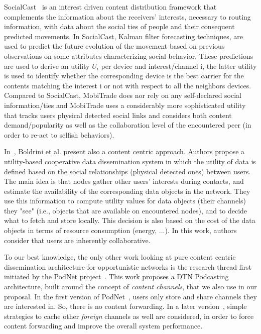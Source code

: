SocialCast~\cite{SocialCast2, SocialCast} is an interest driven content distribution framework that complements the information about the receivers' interests, necessary to routing information, with data about the social ties of people and their consequent predicted movements. In SocialCast, Kalman filter forecasting techniques, are used to predict the future evolution of the movement based on previous observations on some attributes characterizing social behavior. These predictions are used to derive an utility $U_i$ per device and interest/channel i, the latter utility is used to identify whether the corresponding device is the best carrier for the contents matching
the interest i or not with respect to all the neighbors devices. Compared to SocialCast, MobiTrade does nor rely on any self-declared social information/ties and MobiTrade uses a considerably more sophisticated utility that tracks users physical detected social links and considers both content demand/popularity as well as the collaboration level of the encountered peer (in order to re-act to selfish behaviors).

In~\cite{Boldrini:2008:MDD}, Boldrini et al. present also a content centric approach. Authors propose a utility-based cooperative data dissemination system in which the utility of data is defined based on the social
relationships (physical detected ones) between users.  The main idea is that nodes gather other users' interests during contacts, and estimate the availability of the corresponding data objects in the network. They use this information to compute utility values for data objects (their channels) they "see" (i.e., objects that are available on encountered nodes), and to decide what to fetch and store locally. This decision is also based on the cost of the data objects in terms of resource consumption (energy, ...). In this work, authors consider that users are inherently collaborative.

To our best knowledge, the only other work looking at pure content centric dissemination architecture for opportunistic networks is the research thread first initiated by the PodNet project~\cite{May07wirelessopportunistic, podnet07}. This work proposes a DTN Podcasting architecture, built around the concept of \emph{content channels}, that we also use in our proposal. In the first version of PodNet~\cite{May07wirelessopportunistic}, users only store and share channels they are interested in. So, there is no content forwarding. In a later version~\cite{podnet07}, simple strategies to cache other \emph{foreign} channels as well are considered, in order to force content forwarding and  improve the overall system performance. 
 

